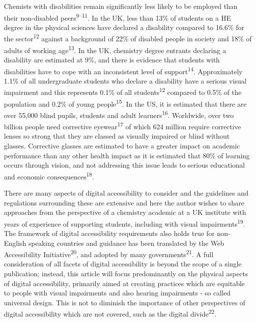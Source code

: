 \documentclass[11.5pt]{sig-alternate} %
\begin{document}
\begin{large}
Chemists with disabilities remain significantly less likely to be employed than their non-disabled peers\textsuperscript{9–11}.  In the UK, less than 13\% of students on a HE degree in the physical sciences have declared a disability compared to 16.6\% for the sector\textsuperscript{12} against a background of 22\% of disabled people in society and 18\% of adults of working age\textsuperscript{13}. In the UK, chemistry degree entrants declaring a disability are estimated at 9\%, and there is evidence that students with disabilities have to cope with an inconsistent level of support\textsuperscript{14}. Approximately 1.1\% of all undergraduate students who declare a disability have a serious visual impairment and this represents 0.1\% of all students\textsuperscript{12} compared to 0.5\% of the population and 0.2\% of young people\textsuperscript{15}. In the US, it is estimated that there are over 55,000 blind pupils, students and adult learners\textsuperscript{16}. Worldwide, over two billion people need corrective eyewear\textsuperscript{17} of which 624 million require corrective lenses so strong that they are classed as visually impaired or blind without glasses. Corrective glasses are estimated to have a greater impact on academic performance than any other health impact as it is estimated that 80\% of learning occurs through vision, and not addressing this issue leads to serious educational and economic consequences\textsuperscript{18}.

There are many aspects of digital accessibility to consider and the guidelines and regulations surrounding these are extensive and here the author wishes to share approaches from the perspective of a chemistry academic at a UK institute with years of experience of supporting students, including with visual impairments\textsuperscript{19}. The framework of digital accessibility requirements also holds true for non-English speaking countries and guidance has been translated by the Web Accessibility Initiative\textsuperscript{20}, and adopted by many governments\textsuperscript{21}. A full consideration of all facets of digital accessibility is beyond the scope of a single publication; instead, this article will focus predominantly on the physical aspects of digital accessibility, primarily aimed at creating practices which are equitable to people with visual impairments and also hearing impairments - so called universal design. This is not to diminish the importance of other perspectives of digital accessibility which are not covered, such as the digital divide\textsuperscript{22}. 


\end{large}
\end{document}

